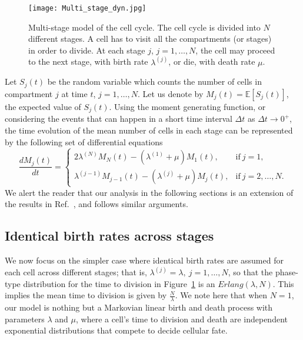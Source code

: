\documentclass[10pt]{article}
\numberwithin{equation}{section}
\begin{document}
\begin{figure}
    \centering
    \texttt{[image: Multi\_stage\_dyn.jpg]}
\caption{Multi-stage model of the cell cycle. The cell cycle is divided into $N$ different stages. A  cell has to visit all the compartments (or stages) in order to divide. At each stage $j$, $j=1, \ldots,N$, the cell may proceed 
to the next stage, with birth rate $\lambda^{(j)}$, or die, with death rate $\mu$.}
\label{BeD}
\end{figure}

Let $S_j(t)$ be the random variable which counts the number of cells in compartment $j$ at time $t$, $j=1,\ldots,N$.
Let us denote by $M_j(t)=\mathbb{E}[S_j(t)]$, the expected value of 
$S_j(t)$. Using the moment generating function, or considering the events that can happen in a short time interval $\Delta t$ as $\Delta t \to 0^+$, the  time
 evolution of the mean number of cells in each stage can be represented 
 by the following set of differential equations
\begin{equation} \label{meantimeev_death}
\frac{dM_j(t)}{dt}=
\begin{cases}
2 \lambda^{(N)} M_N(t) -(\lambda^{(1)}+\mu) M_1(t), & \text{if} \ j=1, 
\\
\lambda^{(j-1)} M_{j-1}(t) - (\lambda^{(j)} + \mu) M_j(t), & \text{if} \ j=2, \ldots, N.
\end{cases}
\end{equation}
 We alert the reader that our analysis in the following sections is an extension of the results in Ref.~\cite{yates}, and follows similar arguments.

\subsection{Identical birth rates across stages}
\label{yates_gen_identical}

We now focus on the simpler
case where identical birth rates are assumed for each cell across different stages;
that is, $\lambda^{(j)}=\lambda,\ j=1,\ldots,N$,
so that the phase-type distribution for the time to division in Figure~\ref{BeD} is an $Erlang(\lambda,N)$.
This implies  the mean time to division is given by $\frac{N}{\lambda}$. We note here that when $N=1$, our model is nothing but a Markovian linear birth and death process with parameters $\lambda$ and $\mu$, where a cell's time to division and death are independent exponential distributions that compete to decide cellular fate. 
\end{document}
